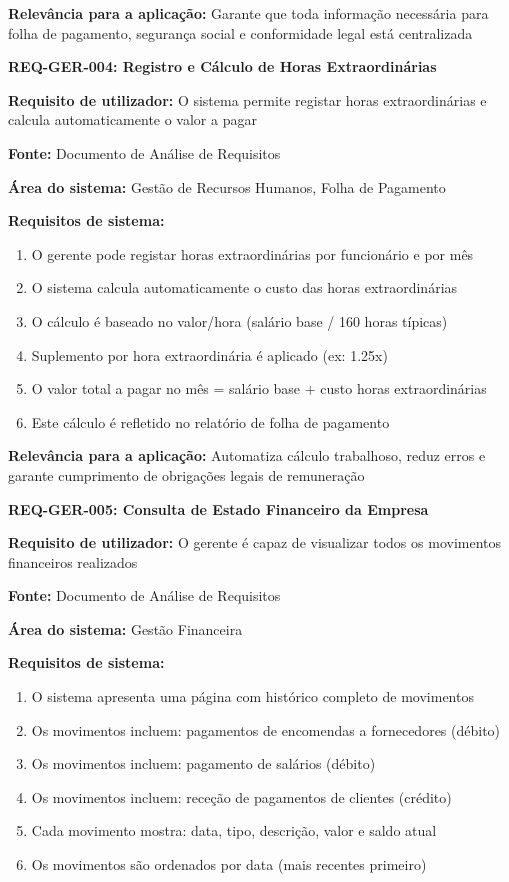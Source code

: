 \documentclass[11pt,a4paper]{article}
\newcommand{\reqheader}[1]{{\noindent\large\bfseries\color{sectionblue}#1}\par\vspace{0.3cm}}
\newcommand{\reqfield}[2]{{\noindent\textbf{#1:} #2}\par\vspace{0.2cm}}
\begin{document}
\reqfield{Relevância para a aplicação}{Garante que toda informação necessária para folha de pagamento, segurança social e conformidade legal está centralizada}

\vspace{0.8cm}

\reqheader{REQ-GER-004: Registro e Cálculo de Horas Extraordinárias}

\reqfield{Requisito de utilizador}{O sistema permite registar horas extraordinárias e calcula automaticamente o valor a pagar}

\reqfield{Fonte}{Documento de Análise de Requisitos}

\reqfield{Área do sistema}{Gestão de Recursos Humanos, Folha de Pagamento}

\reqfield{Requisitos de sistema}{
	\begin{enumerate}
		\item O gerente pode registar horas extraordinárias por funcionário e por mês
		\item O sistema calcula automaticamente o custo das horas extraordinárias
		\item O cálculo é baseado no valor/hora (salário base / 160 horas típicas)
		\item Suplemento por hora extraordinária é aplicado (ex: 1.25x)
		\item O valor total a pagar no mês = salário base + custo horas extraordinárias
		\item Este cálculo é refletido no relatório de folha de pagamento
	\end{enumerate}
}

\reqfield{Relevância para a aplicação}{Automatiza cálculo trabalhoso, reduz erros e garante cumprimento de obrigações legais de remuneração}

\vspace{0.8cm}

\reqheader{REQ-GER-005: Consulta de Estado Financeiro da Empresa}

\reqfield{Requisito de utilizador}{O gerente é capaz de visualizar todos os movimentos financeiros realizados}

\reqfield{Fonte}{Documento de Análise de Requisitos}

\reqfield{Área do sistema}{Gestão Financeira}

\reqfield{Requisitos de sistema}{
	\begin{enumerate}
		\item O sistema apresenta uma página com histórico completo de movimentos
		\item Os movimentos incluem: pagamentos de encomendas a fornecedores (débito)
		\item Os movimentos incluem: pagamento de salários (débito)
		\item Os movimentos incluem: receção de pagamentos de clientes (crédito)
		\item Cada movimento mostra: data, tipo, descrição, valor e saldo atual
		\item Os movimentos são ordenados por data (mais recentes primeiro)
	\end{enumerate}
}
\end{document}
